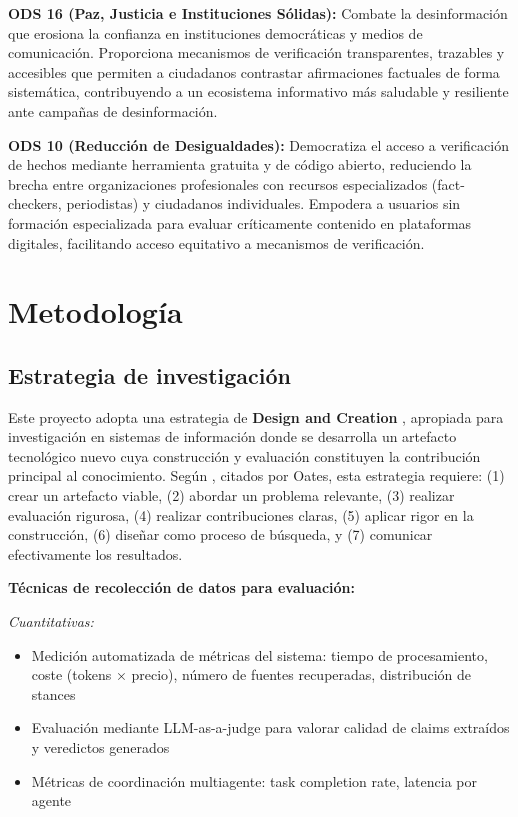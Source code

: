 \documentclass[12pt,a4paper]{article}
\begin{document}
\textbf{ODS 16 (Paz, Justicia e Instituciones Sólidas):} Combate la desinformación que erosiona la confianza en instituciones democráticas y medios de comunicación. Proporciona mecanismos de verificación transparentes, trazables y accesibles que permiten a ciudadanos contrastar afirmaciones factuales de forma sistemática, contribuyendo a un ecosistema informativo más saludable y resiliente ante campañas de desinformación.

\textbf{ODS 10 (Reducción de Desigualdades):} Democratiza el acceso a verificación de hechos mediante herramienta gratuita y de código abierto, reduciendo la brecha entre organizaciones profesionales con recursos especializados (fact-checkers, periodistas) y ciudadanos individuales. Empodera a usuarios sin formación especializada para evaluar críticamente contenido en plataformas digitales, facilitando acceso equitativo a mecanismos de verificación.

\section{Metodología}

\subsection{Estrategia de investigación}

Este proyecto adopta una estrategia de \textbf{Design and Creation} \citep{oates2006}, apropiada para investigación en sistemas de información donde se desarrolla un artefacto tecnológico nuevo cuya construcción y evaluación constituyen la contribución principal al conocimiento. Según \citet{hevner2004}, citados por Oates, esta estrategia requiere: (1) crear un artefacto viable, (2) abordar un problema relevante, (3) realizar evaluación rigurosa, (4) realizar contribuciones claras, (5) aplicar rigor en la construcción, (6) diseñar como proceso de búsqueda, y (7) comunicar efectivamente los resultados.

\textbf{Técnicas de recolección de datos para evaluación:}

\textit{Cuantitativas:}
\begin{itemize}
    \item Medición automatizada de métricas del sistema: tiempo de procesamiento, coste (tokens × precio), número de fuentes recuperadas, distribución de stances
    \item Evaluación mediante LLM-as-a-judge para valorar calidad de claims extraídos y veredictos generados
    \item Métricas de coordinación multiagente: task completion rate, latencia por agente
\end{itemize}
\end{document}
